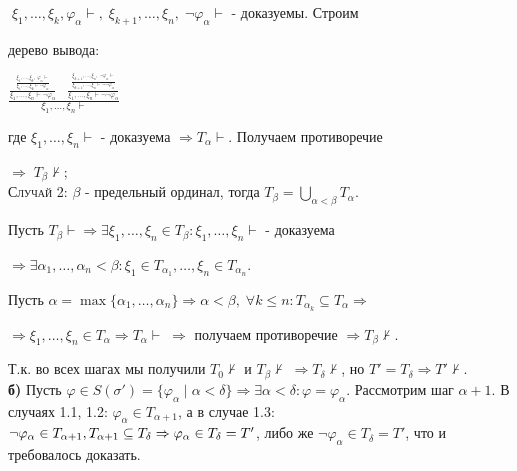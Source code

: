 \documentclass[18pt, a4paper]{extarticle}
\newcommand{\vp}{\varphi}
\newcommand{\vd}{\vdash}
\newcommand{\al}{\alpha}
\begin{document}
\qquad\qquad $\;\xi_1,\dots,\xi_k,\vp_\alpha\vd,\;\xi_{k+1},\dots,\xi_n,\;\lnot\vp_\alpha\vd$ -  доказуемы. Строим 

\qquad\qquad дерево вывода:

\begin{center}
    $\displaystyle \frac{\displaystyle \frac{\displaystyle \frac{\xi_1,\dots,\xi_k,\;\vp_\alpha\vd}{\xi_1,\dots,\xi_k\vd\lnot\vp_\alpha}}{\xi_1,\dots,\xi_n\vd\lnot\vp_\alpha}\;\;\;\; \displaystyle \frac{\displaystyle \frac{\xi_{k+1},\dots,\xi_n,\;\lnot\vp_\alpha\vd}{\xi_{k+1},\dots,\xi_n\vd\lnot\lnot\vp_\alpha}}{\xi_1,\dots,\xi_n\vd\lnot\lnot\vp_\alpha}}{\xi_1,\dots,\xi_n\vd}$
\end{center}

\qquad\qquad где $\xi_1,\dots,\xi_n\vd$ -  доказуема $\Rightarrow T_\alpha\vd$. Получаем противоречие 

\qquad\qquad $\Rightarrow\;T_\beta\nvdash;$\\

\qquad\textsc{Случай 2:} $\beta$ - предельный ординал, тогда $T_\beta=\underset{\alpha<\beta}{\bigcup}T_\alpha$.

\qquad\qquad Пусть $T_\beta\vd\Rightarrow\exists\xi_1,\dots,\xi_n\in T_\beta:\xi_1,\dots,\xi_n\vd$ - доказуема

\qquad\qquad $\Rightarrow\exists\alpha_1,\dots,\alpha_n<\beta:\xi_1\in T_{\alpha_1},\dots,\xi_n\in T_{\alpha_n}$. 

\qquad\qquad Пусть $\alpha=\max\{\alpha_1,\dots,\alpha_n\}\Rightarrow\alpha<\beta,\;\forall k\leqslant n:T_{\alpha_k}\subseteq T_\alpha\Rightarrow$

\qquad\qquad $\Rightarrow\xi_1,\dots,\xi_n\in T_\alpha\Rightarrow T_\alpha\vd\;\Rightarrow$ получаем противоречие $\Rightarrow T_\beta\nvdash$.

Т.к. во всех шагах мы получили $T_0\nvdash$ и $T_\beta\nvdash\;\Rightarrow T_\delta\nvdash$, но $T'=T_\delta\Rightarrow $\underline{$T'\nvdash$}.\\

\textbf{б)} Пусть $\vp\in S(\sigma')=\{\vp_\alpha\;|\;\alpha<\delta\}\Rightarrow\exists\alpha<\delta:\vp=\vp_\alpha$. Рассмотрим шаг \underline{$\alpha+1$}. В случаях 1.1, 1.2: $\vp_\alpha\in T_{\al+1}$, а в случае 1.3: $\lnot\vp_\al\in T_{\al+1},\newline T_{\al+1}\subseteq T_\delta\Rightarrow\vp_\al\in T_\delta=T'$, либо же $\lnot\vp_\al\in T_\delta=T'$, что и требовалось доказать.\\
\end{document}
